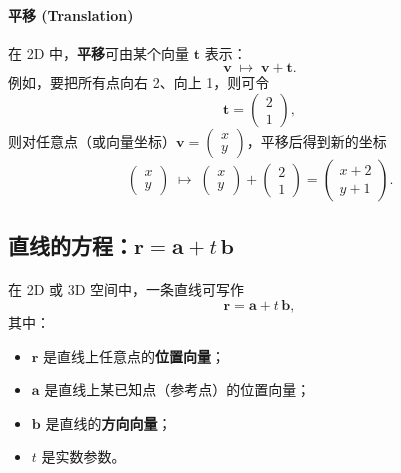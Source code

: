 \documentclass[8pt,a4paper,twoside]{tau-class/tau}
\begin{document}
\begin{tcolorbox}[enhanced, breakable, boxsep=1pt, colframe=blue!50!black, colback=white,
  fonttitle=\footnotesize, fontupper=\footnotesize, title style={align=center},
  title=用向量描述平面变换 (Translation)]
\paragraph{平移 (Translation)}
在 2D 中，\textbf{平移}可由某个向量 \(\mathbf{t}\) 表示：
\[
\mathbf{v} \;\mapsto\; \mathbf{v} + \mathbf{t}.
\]
例如，要把所有点向右 2、向上 1，则可令
\[
\mathbf{t}=\begin{pmatrix}2\\1\end{pmatrix},
\]
则对任意点（或向量坐标）\(\mathbf{v}=\begin{pmatrix}x\\y\end{pmatrix}\)，平移后得到新的坐标
\[
\begin{pmatrix}x\\y\end{pmatrix} \;\mapsto\; \begin{pmatrix}x\\y\end{pmatrix} + \begin{pmatrix}2\\1\end{pmatrix}
= \begin{pmatrix}x+2\\ y+1\end{pmatrix}.
\]
\end{tcolorbox}



\subsection{直线的方程：\(\mathbf{r} = \mathbf{a} + t\,\mathbf{b}\)}
\paragraph{}
在 2D 或 3D 空间中，一条直线可写作
\[
\mathbf{r} = \mathbf{a} + t\,\mathbf{b},
\]
其中：
\begin{itemize}
    \item \(\mathbf{r}\) 是直线上任意点的\textbf{位置向量}；
    \item \(\mathbf{a}\) 是直线上某已知点（参考点）的位置向量；
    \item \(\mathbf{b}\) 是直线的\textbf{方向向量}；
    \item \(t\) 是实数参数。
\end{itemize}
\end{document}
